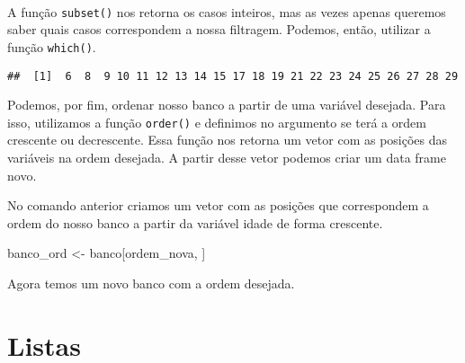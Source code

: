 \documentclass[]{book}
\newenvironment{Shaded}{\begin{snugshade}}{\end{snugshade}}
\newcommand{\DataTypeTok}[1]{\textcolor[rgb]{0.13,0.29,0.53}{#1}}
\newcommand{\DecValTok}[1]{\textcolor[rgb]{0.00,0.00,0.81}{#1}}
\newcommand{\KeywordTok}[1]{\textcolor[rgb]{0.13,0.29,0.53}{\textbf{#1}}}
\newcommand{\NormalTok}[1]{#1}
\newcommand{\OperatorTok}[1]{\textcolor[rgb]{0.81,0.36,0.00}{\textbf{#1}}}
\newcommand{\StringTok}[1]{\textcolor[rgb]{0.31,0.60,0.02}{#1}}
\theoremstyle{definition}
\theoremstyle{definition}
\theoremstyle{definition}
\theoremstyle{remark}
\begin{document}
~

A função \texttt{subset()} nos retorna os casos inteiros, mas as vezes apenas queremos saber quais casos correspondem a nossa filtragem. Podemos, então, utilizar a função \texttt{which()}.

\begin{Shaded}
\end{Shaded}

\begin{verbatim}
##  [1]  6  8  9 10 11 12 13 14 15 17 18 19 21 22 23 24 25 26 27 28 29
\end{verbatim}

Podemos, por fim, ordenar nosso banco a partir de uma variável desejada. Para isso, utilizamos a função \texttt{order()} e definimos no argumento se terá a ordem crescente ou decrescente. Essa função nos retorna um vetor com as posições das variáveis na ordem desejada. A partir desse vetor podemos criar um data frame novo.

\begin{Shaded}
\end{Shaded}

No comando anterior criamos um vetor com as posições que correspondem a ordem do nosso banco a partir da variável idade de forma crescente.

\begin{Shaded}
\begin{Highlighting}[]
\NormalTok{banco_ord <-}\StringTok{ }\NormalTok{banco[ordem_nova, ]}
\end{Highlighting}
\end{Shaded}

Agora temos um novo banco com a ordem desejada.

\hypertarget{listas}{%
\section{Listas}\label{listas}}
\end{document}
